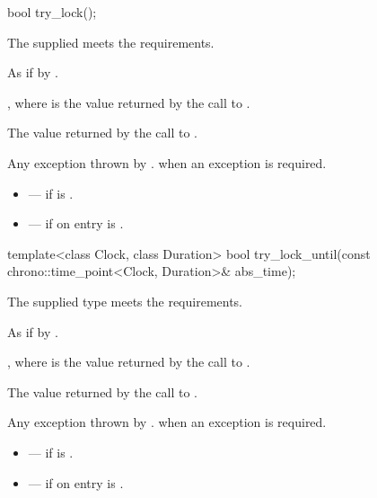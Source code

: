 %
\begin{itemdecl}
bool try_lock();
\end{itemdecl}

\begin{itemdescr}
\pnum
\expects
The supplied  meets the 
requirements.

\pnum
\effects
As if by .

\pnum
\ensures
{}, where  is the value returned by
the call to .

\pnum
\returns
The value returned by the call to .

\pnum
\throws
Any exception thrown by .  when an exception
is required.

\pnum
\errors
\begin{itemize}
\item {} --- if  is .
\item {} --- if on entry 
is .
\end{itemize}
\end{itemdescr}

%
\begin{itemdecl}
template<class Clock, class Duration>
  bool try_lock_until(const chrono::time_point<Clock, Duration>& abs_time);
\end{itemdecl}

\begin{itemdescr}
\pnum
\expects
The supplied  type meets the 
requirements.

\pnum
\effects
As if by .

\pnum
\ensures
{}, where  is the value returned by
the call to .

\pnum
\returns
The value returned by the call to .

\pnum
\throws
Any exception thrown by .  when an
exception is required.

\pnum
\errors
\begin{itemize}
\item {} --- if  is .
\item {} --- if on entry  is
.
\end{itemize}
\end{itemdescr}

